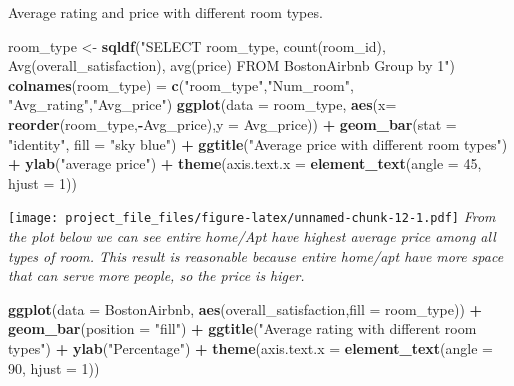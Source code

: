 \documentclass[]{article}
\newenvironment{Shaded}{\begin{snugshade}}{\end{snugshade}}
\newcommand{\KeywordTok}[1]{\textcolor[rgb]{0.13,0.29,0.53}{\textbf{#1}}}
\newcommand{\DataTypeTok}[1]{\textcolor[rgb]{0.13,0.29,0.53}{#1}}
\newcommand{\DecValTok}[1]{\textcolor[rgb]{0.00,0.00,0.81}{#1}}
\newcommand{\StringTok}[1]{\textcolor[rgb]{0.31,0.60,0.02}{#1}}
\newcommand{\OperatorTok}[1]{\textcolor[rgb]{0.81,0.36,0.00}{\textbf{#1}}}
\newcommand{\NormalTok}[1]{#1}
\begin{document}
Average rating and price with different room types.

\begin{Shaded}
\begin{Highlighting}[]
\NormalTok{room_type <-}\StringTok{ }\KeywordTok{sqldf}\NormalTok{(}\StringTok{"SELECT room_type, count(room_id), Avg(overall_satisfaction), avg(price) FROM BostonAirbnb Group by 1"}\NormalTok{)}
\KeywordTok{colnames}\NormalTok{(room_type) =}\StringTok{ }\KeywordTok{c}\NormalTok{(}\StringTok{"room_type"}\NormalTok{,}\StringTok{"Num_room"}\NormalTok{, }\StringTok{"Avg_rating"}\NormalTok{,}\StringTok{"Avg_price"}\NormalTok{)}
\KeywordTok{ggplot}\NormalTok{(}\DataTypeTok{data =}\NormalTok{ room_type, }\KeywordTok{aes}\NormalTok{(}\DataTypeTok{x=} \KeywordTok{reorder}\NormalTok{(room_type,}\OperatorTok{-}\NormalTok{Avg_price),}\DataTypeTok{y =}\NormalTok{ Avg_price)) }\OperatorTok{+}\StringTok{ }\KeywordTok{geom_bar}\NormalTok{(}\DataTypeTok{stat =} \StringTok{"identity"}\NormalTok{, }\DataTypeTok{fill =} \StringTok{"sky blue"}\NormalTok{) }\OperatorTok{+}\StringTok{ }\KeywordTok{ggtitle}\NormalTok{(}\StringTok{"Average price with different room types"}\NormalTok{) }\OperatorTok{+}\StringTok{ }\KeywordTok{ylab}\NormalTok{(}\StringTok{"average price"}\NormalTok{) }\OperatorTok{+}\StringTok{ }\KeywordTok{theme}\NormalTok{(}\DataTypeTok{axis.text.x =} \KeywordTok{element_text}\NormalTok{(}\DataTypeTok{angle =} \DecValTok{45}\NormalTok{, }\DataTypeTok{hjust =} \DecValTok{1}\NormalTok{))}
\end{Highlighting}
\end{Shaded}

\texttt{[image: project\_file\_files/figure-latex/unnamed-chunk-12-1.pdf]}
\emph{From the plot below we can see entire home/Apt have highest
average price among all types of room. This result is reasonable because
entire home/apt have more space that can serve more people, so the price
is higer.}

\begin{Shaded}
\begin{Highlighting}[]
\KeywordTok{ggplot}\NormalTok{(}\DataTypeTok{data =}\NormalTok{ BostonAirbnb, }\KeywordTok{aes}\NormalTok{(overall_satisfaction,}\DataTypeTok{fill =}\NormalTok{ room_type)) }\OperatorTok{+}\StringTok{ }\KeywordTok{geom_bar}\NormalTok{(}\DataTypeTok{position  =} \StringTok{"fill"}\NormalTok{) }\OperatorTok{+}\StringTok{ }\KeywordTok{ggtitle}\NormalTok{(}\StringTok{"Average rating with different room types"}\NormalTok{) }\OperatorTok{+}\StringTok{ }\KeywordTok{ylab}\NormalTok{(}\StringTok{"Percentage"}\NormalTok{) }\OperatorTok{+}\StringTok{ }\KeywordTok{theme}\NormalTok{(}\DataTypeTok{axis.text.x =} \KeywordTok{element_text}\NormalTok{(}\DataTypeTok{angle =} \DecValTok{90}\NormalTok{, }\DataTypeTok{hjust =} \DecValTok{1}\NormalTok{))}
\end{Highlighting}
\end{Shaded}
\end{document}
